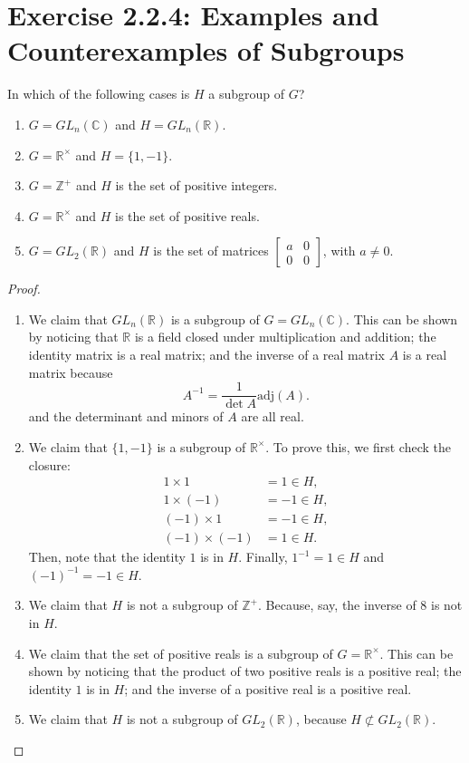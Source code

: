 \documentclass{amsbook}
\theoremstyle{definition}
\theoremstyle{remark}
\numberwithin{section}{chapter}
\numberwithin{equation}{chapter}
\begin{document}
\section{Exercise 2.2.4: Examples and Counterexamples of Subgroups}
In which of the following cases is $H$ a subgroup of $G$?
\begin{enumerate}
\item $G=GL_n(\mathbb{C})$ and $H=GL_n(\mathbb{R})$.
\item $G=\mathbb{R}^\times$ and $H=\{1,-1\}$.
\item $G=\mathbb{Z}^+$ and $H$ is the set of positive integers.
\item $G=\mathbb{R}^\times$ and $H$ is the set of positive reals.
\item $G=GL_2(\mathbb{R})$ and $H$ is the set of matrices $\begin{bmatrix}
a&0\\
0&0
\end{bmatrix}$, with $a\ne 0$.
\end{enumerate}
\begin{proof}
\begin{enumerate}
\item We claim that $GL_n(\mathbb{R})$ is a subgroup of $G=GL_n(\mathbb{C})$. This can be shown by noticing that $\mathbb{R}$ is a field closed under multiplication and addition; the identity matrix is a real matrix; and the inverse of a real matrix $A$ is a real matrix because\[
A^{-1}=\frac{1}{\det A}\text{adj}(A).
\]and the determinant and minors of $A$ are all real.
\item We claim that $\{1,-1\}$ is a subgroup of $\mathbb{R}^\times$. To prove this, we first check the closure:\[
\begin{split}
1\times1&=1\in H,\\
1\times(-1)&=-1\in H,\\
(-1)\times1&=-1\in H,\\
(-1)\times(-1)&=1\in H.
\end{split}
\]Then, note that the identity $1$ is in $H$. Finally, $1^{-1}=1\in H$ and $(-1)^{-1}=-1\in H$.
\item We claim that $H$ is not a subgroup of $\mathbb{Z}^+$. Because, say, the inverse of $8$ is not in $H$.
\item We claim that the set of positive reals is a subgroup of $G=\mathbb{R}^\times$. This can be shown by noticing that the product of two positive reals is a positive real; the identity $1$ is in $H$; and the inverse of a positive real is a positive real.
\item We claim that $H$ is not a subgroup of $GL_2(\mathbb{R})$, because $H\not\subset GL_2(\mathbb{R})$.
\end{enumerate}
\end{proof}

\backmatter


\end{document}
